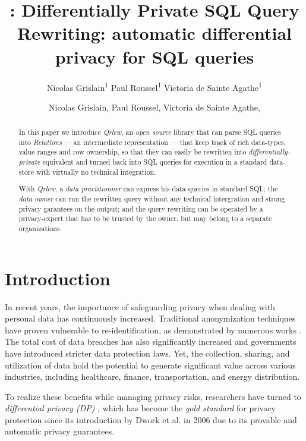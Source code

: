 \documentclass[letterpaper]{article} %
\title{\qrlew: Differentially Private SQL Query Rewriting}
\author{
    Nicolas Grislain\textsuperscript{\rm 1}
    Paul Roussel\textsuperscript{\rm 1}
    Victoria de Sainte Agathe\textsuperscript{\rm 1}
}
\title{\qrlew: automatic differential privacy for SQL queries}
\author {
    Nicolas Grislain,
    Paul Roussel,
    Victoria de Sainte Agathe,
}
\newcommand{\qrlew}{\emph{Qrlew}}
\begin{document}
\maketitle

\begin{abstract}
In this paper we introduce \qrlew{}, an \emph{open source} library that can parse SQL queries into \emph{Relations} --- an intermediate representation --- that keep track of rich data-types, value ranges and row ownership, so that they can easily be rewritten into \emph{differentially-private} equivalent and turned back into SQL queries for execution in a standard data-store with virtually no technical integration.

With \qrlew{}, a \emph{data practitionner} can express his data queries in standard SQL; the \emph{data owner} can run the rewritten query without any technical intergration and strong privacy garantees on the output; and the query rewriting can be operated by a privacy-expert that has to be trusted by the owner, but may belong to a separate organizations.
\end{abstract}

\section{Introduction}

In recent years, the importance of safeguarding privacy when dealing with personal data has continuously increased.
Traditional anonymization techniques have proven vulnerable to re-identification, as demonstrated by numerous works \cite{archie2018s, dwork2017exposed, narayanan2008robust, sweeney2013identifying}.
The total cost of data breaches has also significantly increased \cite{ibm2023cost} and governments have introduced stricter data protection laws.
Yet, the collection, sharing, and utilization of data hold the potential to generate significant value across various industries, including healthcare, finance, transportation, and energy distribution.

To realize these benefits while managing privacy risks, researchers have turned to \emph{differential privacy (DP)} \cite{wood2018differential, dwork2014algorithmic}, which has become the \emph{gold standard} for privacy protection since its introduction by Dwork et al. in 2006 \cite{dwork2006calibrating} due to its provable and automatic privacy guarantees.
\end{document}

